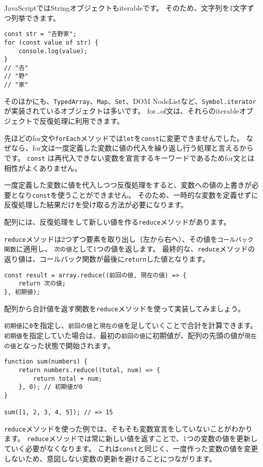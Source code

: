 JavaScriptではStringオブジェクトもiterableです。
そのため、文字列を1文字ずつ列挙できます。

\begin{lstlisting}
const str = "𠮷野家";
for (const value of str) {
    console.log(value);
}
// "𠮷"
// "野"
// "家"
\end{lstlisting}

そのほかにも、\texttt{TypedArray}、\texttt{Map}、\texttt{Set}、DOM
NodeListなど、\texttt{Symbol.iterator}が実装されているオブジェクトは多いです。
for\ldots{}of文は、それらのiterableオブジェクトで反復処理に利用できます。

\begin{tcolorbox}[title=\texttt{let}ではなく\texttt{const}で反復処理をする]\label{const-iteration}

先ほどのfor文や\texttt{forEach}メソッドでは\texttt{let}を\texttt{const}に変更できませんでした。
なぜなら、for文は一度定義した変数に値の代入を繰り返し行う処理と言えるからです。
\texttt{const}
は再代入できない変数を宣言するキーワードであるためfor文とは相性がよくありません。

一度定義した変数に値を代入しつつ反復処理をすると、変数への値の上書きが必要となり\texttt{const}を使うことができません。
そのため、一時的な変数を定義せずに反復処理した結果だけを受け取る方法が必要になります。

配列には、反復処理をして新しい値を作る\texttt{reduce}メソッドがあります。

\texttt{reduce}メソッドは2つずつ要素を取り出し（左から右へ）、その値を\texttt{コールバック関数}に適用し、
\texttt{次の値}として1つの値を返します。
最終的な、\texttt{reduce}メソッドの返り値は、コールバック関数が最後に\texttt{return}した値となります。

\begin{lstlisting}
const result = array.reduce((前回の値, 現在の値) => {
    return 次の値;
}, 初期値);
\end{lstlisting}

配列から合計値を返す関数を\texttt{reduce}メソッドを使って実装してみましょう。

\texttt{初期値}に\texttt{0}を指定し、\texttt{前回の値}と\texttt{現在の値}を足していくことで合計を計算できます。
\texttt{初期値}を指定していた場合は、最初の\texttt{前回の値}に初期値が、配列の先頭の値が\texttt{現在の値}となった状態で開始されます。

\begin{lstlisting}
function sum(numbers) {
    return numbers.reduce((total, num) => {
        return total + num;
    }, 0); // 初期値が0
}

sum([1, 2, 3, 4, 5]); // => 15
\end{lstlisting}

\texttt{reduce}メソッドを使った例では、そもそも変数宣言をしていないことがわかります。
\texttt{reduce}メソッドでは常に新しい値を返すことで、1つの変数の値を更新していく必要がなくなります。
これは\texttt{const}と同じく、一度作った変数の値を変更しないため、意図しない変数の更新を避けることにつながります。
\end{tcolorbox}


